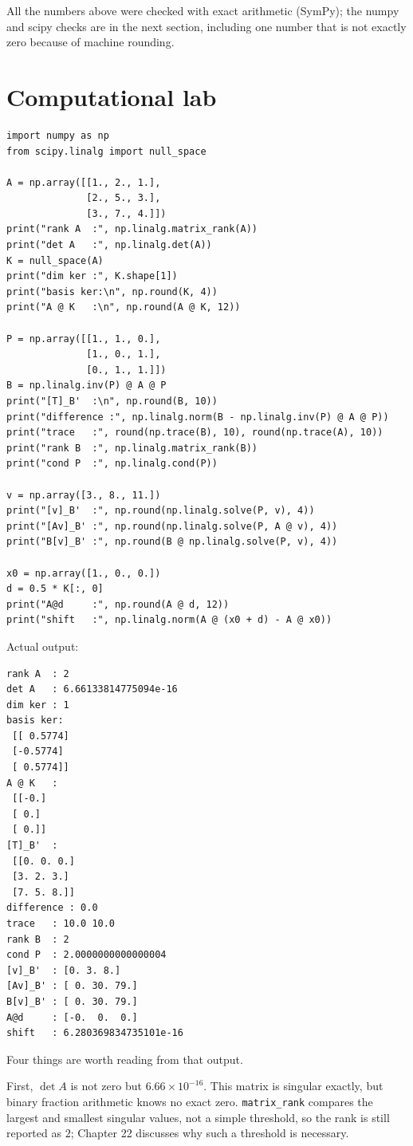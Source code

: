 All the numbers above were checked with exact arithmetic (SymPy); the numpy and
scipy checks are in the next section, including one number that is not exactly zero because of machine
rounding.

\section{Computational lab}

\begin{lab}
\begin{verbatim}
import numpy as np
from scipy.linalg import null_space

A = np.array([[1., 2., 1.],
              [2., 5., 3.],
              [3., 7., 4.]])
print("rank A  :", np.linalg.matrix_rank(A))
print("det A   :", np.linalg.det(A))
K = null_space(A)
print("dim ker :", K.shape[1])
print("basis ker:\n", np.round(K, 4))
print("A @ K   :\n", np.round(A @ K, 12))

P = np.array([[1., 1., 0.],
              [1., 0., 1.],
              [0., 1., 1.]])
B = np.linalg.inv(P) @ A @ P
print("[T]_B'  :\n", np.round(B, 10))
print("difference :", np.linalg.norm(B - np.linalg.inv(P) @ A @ P))
print("trace   :", round(np.trace(B), 10), round(np.trace(A), 10))
print("rank B  :", np.linalg.matrix_rank(B))
print("cond P  :", np.linalg.cond(P))

v = np.array([3., 8., 11.])
print("[v]_B'  :", np.round(np.linalg.solve(P, v), 4))
print("[Av]_B' :", np.round(np.linalg.solve(P, A @ v), 4))
print("B[v]_B' :", np.round(B @ np.linalg.solve(P, v), 4))

x0 = np.array([1., 0., 0.])
d = 0.5 * K[:, 0]
print("A@d     :", np.round(A @ d, 12))
print("shift   :", np.linalg.norm(A @ (x0 + d) - A @ x0))
\end{verbatim}
Actual output:
\begin{verbatim}
rank A  : 2
det A   : 6.66133814775094e-16
dim ker : 1
basis ker:
 [[ 0.5774]
 [-0.5774]
 [ 0.5774]]
A @ K   :
 [[-0.]
 [ 0.]
 [ 0.]]
[T]_B'  :
 [[0. 0. 0.]
 [3. 2. 3.]
 [7. 5. 8.]]
difference : 0.0
trace   : 10.0 10.0
rank B  : 2
cond P  : 2.0000000000000004
[v]_B'  : [0. 3. 8.]
[Av]_B' : [ 0. 30. 79.]
B[v]_B' : [ 0. 30. 79.]
A@d     : [-0.  0.  0.]
shift   : 6.280369834735101e-16
\end{verbatim}
\end{lab}

Four things are worth reading from that output.

First, $\det A$ is not zero but $6.66\times10^{-16}$. This matrix is singular
exactly, but binary fraction arithmetic knows no exact zero.
\texttt{matrix\_rank} compares the largest and smallest singular values, not a simple threshold,
so the rank is still reported as $2$; Chapter 22 discusses why such a threshold is necessary.

